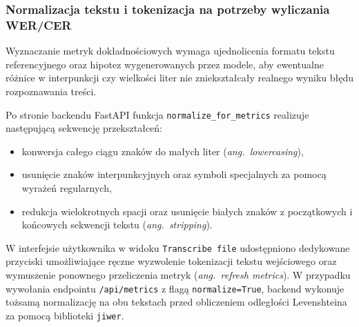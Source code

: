 \subsubsection{Normalizacja tekstu i tokenizacja na potrzeby wyliczania WER/CER}

Wyznaczanie metryk dokładnościowych wymaga ujednolicenia formatu tekstu referencyjnego oraz hipotez wygenerowanych przez modele, aby ewentualne różnice w interpunkcji czy wielkości liter nie zniekształcały realnego wyniku błędu rozpoznawania treści.

Po stronie backendu FastAPI funkcja \texttt{normalize\_for\_metrics} realizuje następującą sekwencję przekształceń:
\begin{itemize}
    \item konwersja całego ciągu znaków do małych liter (\textit{ang.~lowercasing}),
    \item usunięcie znaków interpunkcyjnych oraz symboli specjalnych za pomocą wyrażeń regularnych,
    \item redukcja wielokrotnych spacji oraz usunięcie białych znaków z początkowych i końcowych sekwencji tekstu (\textit{ang.~stripping}).
\end{itemize}

W interfejsie użytkownika w widoku \texttt{Transcribe file} udostępniono dedykowane przyciski umożliwiające ręczne wyzwolenie tokenizacji tekstu wejściowego oraz wymuszenie ponownego przeliczenia metryk (\textit{ang.~refresh metrics}). W przypadku wywołania endpointu \texttt{/api/metrics} z flagą \texttt{normalize=True}, backend wykonuje tożsamą normalizację na obu tekstach przed obliczeniem odległości Levenshteina za pomocą biblioteki \texttt{jiwer}.
